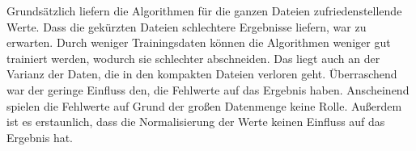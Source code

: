 \documentclass[letterpaper]{article} %
\begin{document}
    Grundsätzlich liefern die Algorithmen für die ganzen Dateien zufriedenstellende Werte. Dass die gekürzten Dateien schlechtere Ergebnisse liefern, war zu erwarten. Durch weniger Trainingsdaten können die Algorithmen weniger gut trainiert werden, wodurch sie schlechter abschneiden. Das liegt auch an der Varianz der Daten, die in den kompakten Dateien verloren geht. Überraschend war der geringe Einfluss den, die Fehlwerte auf das Ergebnis haben. Anscheinend spielen die Fehlwerte auf Grund der großen Datenmenge keine Rolle. Außerdem ist es erstaunlich, dass die Normalisierung der Werte keinen Einfluss auf das Ergebnis hat. 


\end{document}
